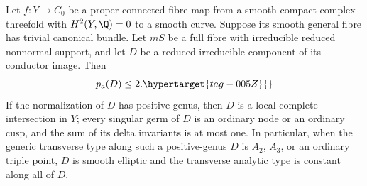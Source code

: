 \begin{proposition}\hypertarget{tag-01B4}{}\label{cdp:st:A.5.14}

Let $f:Y\to C_0$ be a proper connected-fibre map from a
smooth compact complex threefold with $H^2(Y,\Q)=0$ to
a smooth curve. Suppose its smooth general fibre has
trivial canonical bundle. Let $mS$ be a full fibre with
irreducible reduced nonnormal support, and let $D$ be
a reduced irreducible component of its conductor image.
Then
\begin{equation}
                         p_a(D)\le2.                \hypertarget{tag-005Z}{}\label{cdp:eq:A.J.30}
\end{equation}
If the normalization of $D$ has positive genus, then
$D$ is a local complete intersection in $Y$; every
singular germ of $D$ is an ordinary node or an ordinary
cusp, and the sum of its delta invariants is at most
one. In particular, when the generic transverse type
along such a positive-genus $D$ is $A_2$, $A_3$, or an
ordinary triple point, $D$ is smooth elliptic and the
transverse analytic type is constant along all of $D$.
\end{proposition}


